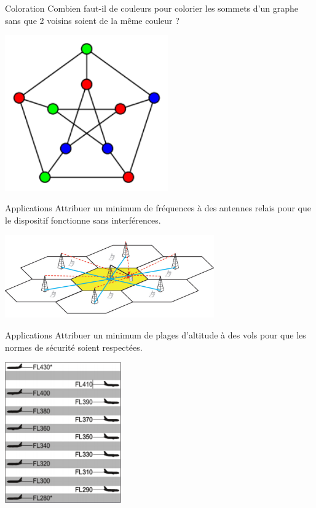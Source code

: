 \documentclass[10pt]{beamer}
\begin{document}
\begin{frame}{Coloration}
Combien faut-il de couleurs pour colorier les sommets d'un graphe sans que 2 voisins soient de la même couleur ?
\begin{center}
\includegraphics[width=7cm]{img/color}
\end{center}
\end{frame}



\begin{frame}{Applications}
Attribuer un minimum de fréquences à des antennes relais pour que le dispositif fonctionne sans interférences.
\begin{center}
\includegraphics[width=9cm]{img/relais}
\end{center}
\end{frame}

\begin{frame}{Applications}
Attribuer un minimum de plages d'altitude à des vols pour que les normes de sécurité soient respectées.
\begin{center}
\includegraphics[width=5cm]{img/vols}
\end{center}
\end{frame}
\end{document}
